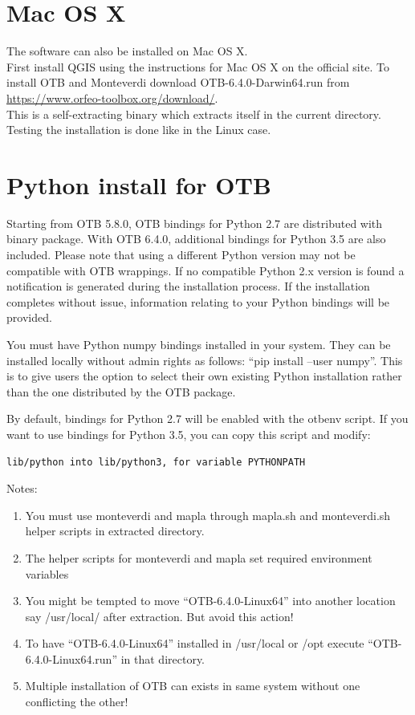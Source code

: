 \documentclass[10pt,a4paper]{article}
\begin{document}
\clearpage
\section{Mac OS X}

The software can also be installed on Mac OS X. \\

First install QGIS using the instructions for Mac OS X on the official site. To install OTB and  Monteverdi download 
OTB-6.4.0-Darwin64.run from \url{https://www.orfeo-toolbox.org/download/}. \\

This is a self-extracting binary which extracts itself in the current directory. Testing the installation is done like in the Linux case.

\clearpage
\section{Python install for OTB}

Starting from OTB 5.8.0, OTB bindings for Python 2.7 are distributed with binary package. With OTB 6.4.0, additional bindings for Python 3.5 are also included. Please note that using a different Python version may not be compatible with OTB wrappings. If no compatible Python 2.x version is found a notification is generated during the installation process. If the installation completes without issue, information relating to your Python bindings will be provided.

You must have Python numpy bindings installed in your system. They can be installed locally without admin rights as follows: “pip install –user numpy”. This is to give users the option to select their own existing Python installation rather than the one distributed by the OTB package.

By default, bindings for Python 2.7 will be enabled with the otbenv script. If you want to use bindings for Python 3.5, you can copy this script and modify:
\begin{verbatim}
lib/python into lib/python3, for variable PYTHONPATH
\end{verbatim}

Notes:
\begin{enumerate}

\item You must use monteverdi and mapla through mapla.sh and monteverdi.sh helper scripts in extracted directory.
\item The helper scripts for monteverdi and mapla set required environment variables
\item You might be tempted to move “OTB-6.4.0-Linux64” into another location say /usr/local/ after extraction. But avoid this action!
\item To have “OTB-6.4.0-Linux64” installed in /usr/local or /opt execute “OTB-6.4.0-Linux64.run” in that directory.
\item Multiple installation of OTB can exists in same system without one conflicting the other!

\end{enumerate}
\end{document}
